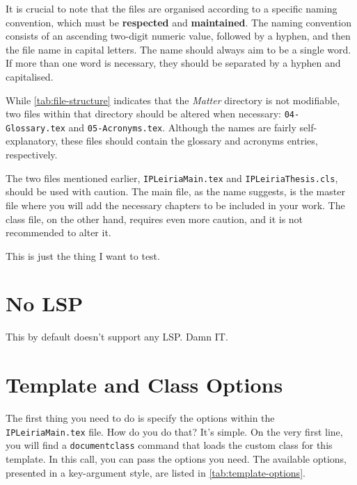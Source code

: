 It is crucial to note that the files are organised according to a specific naming convention, which must be \textbf{respected} and \textbf{maintained}. The naming convention consists of an ascending two-digit numeric value, followed by a hyphen, and then the file name in capital letters. The name should always aim to be a single word. If more than one word is necessary, they should be separated by a hyphen and capitalised.

\begin{block}[note]
While \autoref{tab:file-structure} indicates that the \textit{Matter} directory is not modifiable, two files within that directory should be altered when necessary: \texttt{04-Glossary.tex} and \texttt{05-Acronyms.tex}. Although the names are fairly self-explanatory, these files should contain the glossary and acronyms entries, respectively.
\end{block}

The two files mentioned earlier, \texttt{IPLeiriaMain.tex} and \texttt{IPLeiriaThesis.cls}, should be used with caution. The main file, as the name suggests, is the master file where you will add the necessary chapters to be included in your work. The class file, on the other hand, requires even more caution, and it is not recommended to alter it.

This is just the thing I want to test.

\section{No LSP}
This by default doesn't support any LSP. Damn IT.

\section{Template and Class Options}
\label{sec:class-options}
The first thing you need to do is specify the options within the \texttt{IPLeiriaMain.tex} file. How do you do that? It's simple. On the very first line, you will find a \texttt{documentclass} command that loads the custom class for this template. In this call, you can pass the options you need. The available options, presented in a key-argument style, are listed in \autoref{tab:template-options}.

